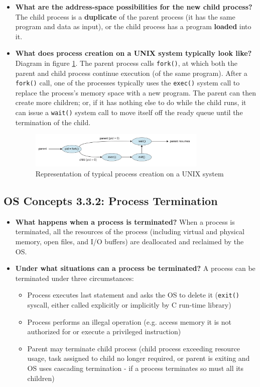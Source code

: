 \documentclass[12pt]{article}
\begin{document}
\begin{itemize}
    \item \textbf{What are the address-space possibilities for the new child process?} The child process is a \textbf{duplicate} of the parent process (it has the same program and data as input), or the child process has a program \textbf{loaded} into it.
    \item \textbf{What does process creation on a UNIX system typically look like?} Diagram in figure \ref{fig:unix-process-creation}. The parent process calls \texttt{fork()}, at which both the parent and child process continue execution (of the same program). After a \texttt{fork()} call, one of the processes typically uses the \texttt{exec()} system call to replace the process's memory space with a new program. The parent can then create more children; or, if it has nothing else to do while the child runs, it can issue a \texttt{wait()} system call to move itself off the ready queue until the termination of the child.
        \begin{figure}[ht]
            \centering
            \includegraphics[width=0.8\textwidth]{figures/unix-process-creation.jpg}
            \caption{Representation of typical process creation on a UNIX system}
            \label{fig:unix-process-creation}
        \end{figure}
\end{itemize}

\subsection*{OS Concepts 3.3.2: Process Termination}

\begin{itemize}
    \item \textbf{What happens when a process is terminated?} When a process is terminated, all the resources of the process (including virtual and physical memory, open files, and I/O buffers) are deallocated and reclaimed by the OS.
    \item \textbf{Under what situations can a process be terminated?} A process can be terminated under three circumstances:
        \begin{itemize}
            \item Process executes last statement and asks the OS to delete it (\texttt{exit()} syscall, either called explicitly or implicitly by C run-time library)
            \item Process performs an illegal operation (e.g. access memory it is not authorized for or execute a privileged instruction)
            \item Parent may terminate child process (child process exceeding resource usage, task assigned to child no longer required, or parent is exiting and OS uses cascading termination - if a process terminates so must all its children)
        \end{itemize}
\end{itemize}
\end{document}
